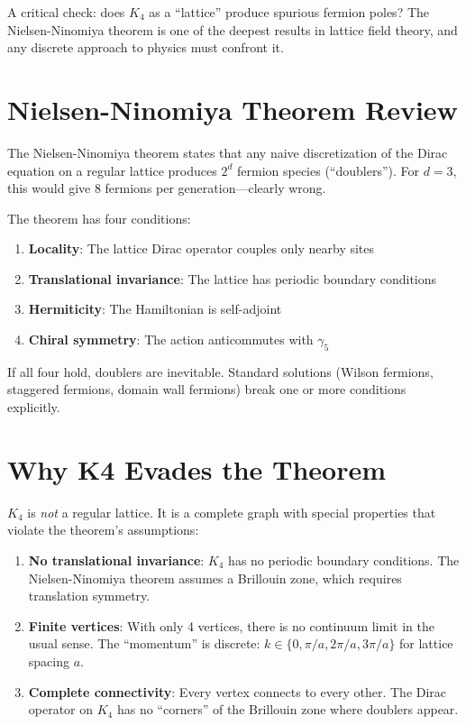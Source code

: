 \documentclass[11pt,a4paper]{book}
\def\texorpdfstring#1#2{#2}%
\begin{document}
A critical check: does $K_4$ as a ``lattice'' produce spurious fermion poles? The Nielsen-Ninomiya theorem is one of the deepest results in lattice field theory, and any discrete approach to physics must confront it.

\section{Nielsen-Ninomiya Theorem Review}

The Nielsen-Ninomiya theorem states that any naive discretization of the Dirac equation on a regular lattice produces $2^d$ fermion species (``doublers''). For $d = 3$, this would give 8 fermions per generation---clearly wrong.

The theorem has four conditions:
\begin{enumerate}
\item \textbf{Locality}: The lattice Dirac operator couples only nearby sites
\item \textbf{Translational invariance}: The lattice has periodic boundary conditions
\item \textbf{Hermiticity}: The Hamiltonian is self-adjoint
\item \textbf{Chiral symmetry}: The action anticommutes with $\gamma_5$
\end{enumerate}

If all four hold, doublers are inevitable. Standard solutions (Wilson fermions, staggered fermions, domain wall fermions) break one or more conditions explicitly.

\section{Why \texorpdfstring{$K_4$}{K4} Evades the Theorem}

$K_4$ is \emph{not} a regular lattice. It is a complete graph with special properties that violate the theorem's assumptions:

\begin{enumerate}
\item \textbf{No translational invariance}: $K_4$ has no periodic boundary conditions. The Nielsen-Ninomiya theorem assumes a Brillouin zone, which requires translation symmetry.

\item \textbf{Finite vertices}: With only 4 vertices, there is no continuum limit in the usual sense. The ``momentum'' is discrete: $k \in \{0, \pi/a, 2\pi/a, 3\pi/a\}$ for lattice spacing $a$.

\item \textbf{Complete connectivity}: Every vertex connects to every other. The Dirac operator on $K_4$ has no ``corners'' of the Brillouin zone where doublers appear.
\end{enumerate}
\end{document}
